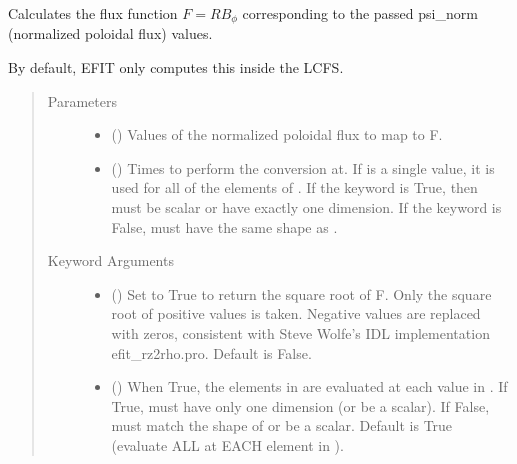 \documentclass[letterpaper,10pt,english]{sphinxmanual}
\begin{document}
\begin{fulllineitems}
\begin{fulllineitems}
\label{\detokenize{eqtools:eqtools.core.Equilibrium.psinorm2F}}
Calculates the flux function \(F=RB_{\phi}\) corresponding to the passed psi\_norm (normalized poloidal flux) values.

By default, EFIT only computes this inside the LCFS.
\begin{quote}\begin{description}
\item[{Parameters}] \leavevmode\begin{itemize}
\item {} 
 () \textendash{} Values of the normalized
poloidal flux to map to F.

\item {} 
 () \textendash{} Times to perform the conversion at.
If  is a single value, it is used for all of the elements of
. If the  keyword is True, then  must be scalar
or have exactly one dimension. If the  keyword is False,
 must have the same shape as .

\end{itemize}

\item[{Keyword Arguments}] \leavevmode\begin{itemize}
\item {} 
 () \textendash{} Set to True to return the square root of F. Only
the square root of positive values is taken. Negative values are
replaced with zeros, consistent with Steve Wolfe’s IDL
implementation efit\_rz2rho.pro. Default is False.

\item {} 
 () \textendash{} When True, the elements in  are evaluated at
each value in . If True,  must have only one dimension (or
be a scalar). If False,  must match the shape of  or be
a scalar. Default is True (evaluate ALL  at EACH element in
).


\end{itemize}
\end{description}
\end{quote}
\end{fulllineitems}
\end{fulllineitems}
\end{document}
